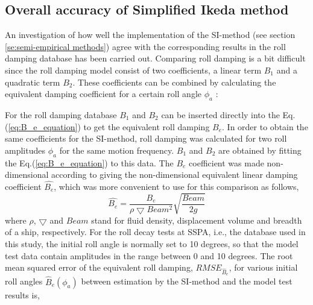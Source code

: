 \subsection{Overall accuracy of Simplified Ikeda method}
\label{se:overall_comparison}
An investigation of how well the implementation of the SI-method (see section \ref{se:semi-empirical methods}) agree with the corresponding results in the roll damping database has been carried out. 
Comparing roll damping is a bit difficult since the roll damping model consist of two coefficients, a linear term $B_1$ and a quadratic term $B_2$. These coefficients can be combined by calculating the equivalent damping coefficient for a certain roll angle $\phi_a$ \parencite{himeno_prediction_1981}:


For the roll damping database $B_1$ and $B_2$ can be inserted directly into the Eq.(\ref{eq:B_e_equation}) to get the equivalent roll damping $B_e$.
In order to obtain the same coefficients for the SI-method, roll damping was calculated for two roll amplitudes $\phi_a$ for the same motion frequency. $B_1$ and $B_2$ are obtained by fitting the Eq.(\ref{eq:B_e_equation}) to this data. The $B_e$ coefficient was made non-dimensional according to \parencite{himeno_prediction_1981}  giving the non-dimensional equivalent linear damping coefficient $\hat{B_e}$, which was more convenient to use for this comparison as follows,
\begin{equation} \label{eq:be_eqvalent}
    \hat{B_e} = \frac{B_e}{\rho \bigtriangledown Beam^2} \sqrt{\frac{Beam}{2g}}
\end{equation}
where $\rho$, $\bigtriangledown$ and $Beam$ stand for fluid density, displacement volume and breadth of a ship, respectively.
For the roll decay tests at SSPA, i.e., the database used in this study, the initial roll angle is normally set to 10 degrees, so that the model test data contain amplitudes in the range between 0 and 10 degrees. The root mean squared error of the equivalent roll damping, $RMSE_{\hat{B}_e}$, for various initial roll angles $\hat{B}_e(\phi_a)$ between estimation by the SI-method and the model test results is,

